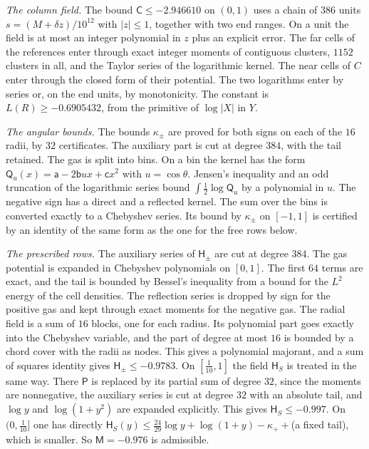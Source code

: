 \emph{The column field.} The bound $\mathsf C\le-2.946610$ on $(0,1)$ uses a chain of $386$ units $s=(M+\delta z)/10^{12}$ with $|z|\le1$, together with two end ranges. On a unit the field is at most an integer polynomial in $z$ plus an explicit
error. The far cells of the references enter through exact integer moments of contiguous clusters, $1152$ clusters in all, and the Taylor series of the logarithmic kernel. The near cells of $C$ enter through the closed form of their potential. The two logarithms enter by
series or, on the end units, by monotonicity. The constant is $L(R)\ge-0.6905432$, from the primitive of $\log|X|$ in $Y$.

\emph{The angular bounds.} The bounds $\kappa_\pm$ are proved for both signs on each of the $16$ radii, by $32$ certificates. The auxiliary part is cut at degree $384$, with the tail retained. The gas is split into bins. On a bin the kernel has the form
$\mathsf Q_u(x)=\mathsf a-2\mathsf bux+\mathsf cx^2$ with $u=\cos\theta$. Jensen's inequality and an odd truncation of the logarithmic series bound $\int\frac12\log\mathsf Q_u$ by a polynomial in $u$. The negative sign has a direct and a reflected kernel. The sum over the bins
is converted exactly to a Chebyshev series. Its bound by $\kappa_\pm$ on $[-1,1]$ is certified by an identity of the same form as the one for the free rows below.

\emph{The prescribed rows.} The auxiliary series of $\mathsf H_\pm$ are cut at degree $384$. The gas potential is expanded in Chebyshev polynomials on $[0,1]$. The first $64$ terms are exact, and the tail is bounded by Bessel's inequality from a bound for the $L^2$ energy of the cell densities.
The reflection series is dropped by sign for the positive gas and kept through exact moments for the negative gas. The radial field is a sum of $16$ blocks, one for each radius. Its polynomial part goes exactly into the Chebyshev variable, and the part of degree at most $16$ is bounded by
a chord cover with the radii as nodes. This gives a polynomial majorant, and a sum of squares identity gives $\mathsf H_\pm\le-0.9783$. On $[\frac1{10},1]$ the field $\mathsf H_S$ is treated in the same way. There $\mathsf P$ is replaced by its partial sum of degree $32$, since the moments are nonnegative, the auxiliary series is cut at degree $32$ with an absolute tail, and
$\log y$ and $\log(1+y^2)$ are expanded explicitly. This gives $\mathsf H_S\le-0.997$. On $(0,\frac1{10}]$ one has directly $\mathsf H_S(y)\le\frac{24}{29}\log y+\log(1+y)-\kappa_++$(a fixed tail), which is smaller. So $\mathsf M=-0.976$ is admissible.

